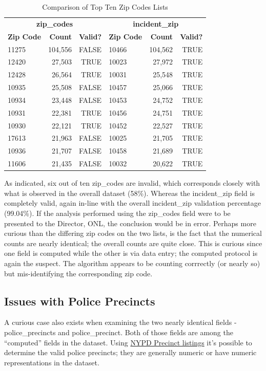 \documentclass[12pt, titlepage]{article}
\begin{document}
{	\begin{table}[H]
	\centering
	\footnotesize
	\begin{tabular}{lrr@{\hskip 0.5cm}|@{\hskip 0.5cm}lrr}
	\toprule
	\multicolumn{3}{c}{\textbf{zip\_codes}} & \multicolumn{3}{c}{\textbf{incident\_zip}} \\
	\cmidrule(r){1-3} \cmidrule(l){4-6}
	\textbf{Zip Code} & \textbf{Count} & \textbf{Valid?} & \textbf{Zip Code} & \textbf{Count} & \textbf{Valid?} \\
		\midrule
		11275 & 104,556 & FALSE & 10466 & 104,562 & TRUE \\
		12420 & 27,503 & TRUE & 10023 & 27,972 & TRUE \\
		12428 & 26,564 & TRUE & 10031 & 25,548 & TRUE \\
		10935 & 25,508 & FALSE & 10457 & 25,066 & TRUE \\
		10934 & 23,448 & FALSE & 10453 & 24,752 & TRUE \\
		10931 & 22,381 & TRUE & 10456 & 24,751 & TRUE \\
		10930 & 22,121 & TRUE & 10452 & 22,527 & TRUE \\
		17613 & 21,963 & FALSE & 10025 & 21,705 & TRUE \\
		10936 & 21,707 & FALSE & 10458 & 21,689 & TRUE \\
		11606 & 21,435 & FALSE & 10032 & 20,622 & TRUE \\
		\bottomrule
	\end{tabular}
	\caption{Comparison of Top Ten Zip Codes Lists}
	\end{table}

	As indicated, six out of ten zip\_codes are invalid, which corresponds closely with what is observed in the overall dataset (58\%). Whereas the incident\_zip
	field is completely valid, again in-line with the overall incident\_zip validation percentage (99.04\%). If the analysis performed using the zip\_codes field were to be
	presented to the Director, ONL, the conclusion would be in error. Perhaps more curious than the differing zip codes on the two lists, 
	is the fact that the numerical counts are nearly identical;  the overall counts are quite close. This is curious since
	one field is computed while the other is via data entry; the computed protocol is again the suspect. The algorithm appears to be counting corrrectly (or nearly so)
	but mis-identifying the corresponding zip code.

	
	\subsection{Issues with Police Precincts}
	\label{sec:police-precincts}
	A curious case also exists when examining the two nearly identical fields - police\_precincts and police\_precinct. Both of those fields are among
	the ``computed'' fields in the dataset. 
	Using \href{https://www.nyc.gov/site/nypd/bureaus/patrol/precincts-landing.page}{NYPD Precinct listings} it's possible to determine the valid
	police precincts; they are generally numeric or have numeric representations in the dataset. 
	
}
\end{document}
